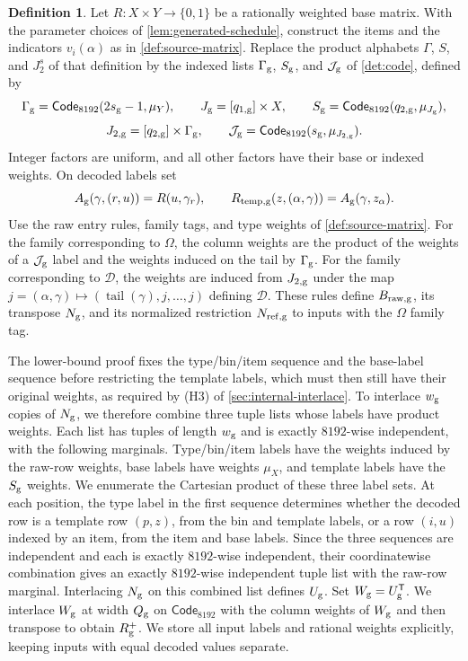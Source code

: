 \documentclass[11pt,letterpaper]{article} \usepackage[utf8]{inputenc}
\theoremstyle{plain} \newtheorem{theorem}{Theorem}[section]
\theoremstyle{definition} \newaliascnt{definition}{theorem}
\newtheorem{definition}[definition]{Definition} \aliascntresetthe{definition}
\begin{document}
\begin{definition}\label{det:construction}
Let \(R:X\times Y\to\{0,1\}\) be a rationally weighted base matrix. With the
parameter choices of \cref{lem:generated-schedule}, construct the items
and the indicators \(v_i(\alpha)\) as in \cref{def:source-matrix}.
Replace the product alphabets \(\Gamma\), \(S\), and \(J_2^s\) of that definition by the indexed
lists \(\Gamma_{\rm g}\), \(S_{\rm g}\), and \(\mathcal J_{\rm g}\) of
\cref{det:code}, defined by
\[
\Gamma_{\rm g}=\mathsf{Code}_{8192}(2s_{\rm g}-1,\mu_Y),\qquad J_{\rm
g}=[q_{1,\rm g}]\times X,\qquad S_{\rm g}=\mathsf{Code}_{8192}(q_{2,\rm
g},\mu_{J_{\rm g}}),
\]
\[
J_{2,\rm g}=[q_{2,\rm g}]\times\Gamma_{\rm g},\qquad \mathcal J_{\rm
g}=\mathsf{Code}_{8192}(s_{\rm g},\mu_{J_{2,\rm g}}).
\]
Integer factors are uniform, and all other factors have their base or indexed
weights. On decoded labels set
\[
A_{\rm g}(\gamma,(r,u))=R(u,\gamma_r),\qquad R_{\rm temp,g}(z,(\alpha,\gamma))=A_{\rm g}(\gamma,z_\alpha).
\]
Use the raw entry rules, family tags, and type weights of
\cref{def:source-matrix}. For the family corresponding to $\Omega$, the
column weights are the product of the weights of a $\mathcal J_{\rm g}$ label
and the weights induced on the tail by $\Gamma_{\rm g}$. For the family
corresponding to $\mathcal D$, the weights are induced from $J_{2,\rm g}$ under
the map $j=(\alpha,\gamma)\mapsto(\operatorname{tail}(\gamma),j,\ldots,j)$ defining
$\mathcal D$. These rules define $B_{\rm raw,g}$, its transpose $N_{\rm g}$, and its
normalized restriction $N_{\rm ref,g}$ to inputs with the $\Omega$ family tag.

The lower-bound proof fixes the type/bin/item sequence and the base-label
sequence before restricting the template labels, which must then still have
their original weights, as required by (H3) of \cref{sec:internal-interlace}.
To interlace \(w_{\rm g}\) copies of \(N_{\rm g}\), we therefore combine three
tuple lists whose labels have product weights. Each list has
tuples of length \(w_{\rm g}\) and is exactly \(8192\)-wise independent,
with the following marginals.
Type/bin/item labels have the weights induced by the raw-row weights,
base labels have weights \(\mu_X\), and template labels have the \(S_{\rm g}\)
weights. We enumerate the Cartesian product of these three label sets.
At each position, the type label in the first sequence determines whether the
decoded row is a template row \((p,z)\), from the bin and template labels, or a row
\((i,u)\) indexed by an item, from the item and base labels. Since the three sequences
are independent and each is exactly \(8192\)-wise independent, their
coordinatewise combination gives an exactly \(8192\)-wise
independent tuple list with the raw-row marginal. Interlacing \(N_{\rm g}\) on
this combined list defines \(U_{\rm g}\). Set \(W_{\rm g}=U_{\rm
g}^{\mathsf T}\). We interlace \(W_{\rm g}\) at width \(Q_{\rm g}\) on
\(\mathsf{Code}_{8192}\) with the column weights of \(W_{\rm g}\) and then transpose to obtain \(R_{\rm
g}^{+}\). We store all input labels and rational weights explicitly, keeping inputs with
equal decoded values separate.
\end{definition}
\end{document}
